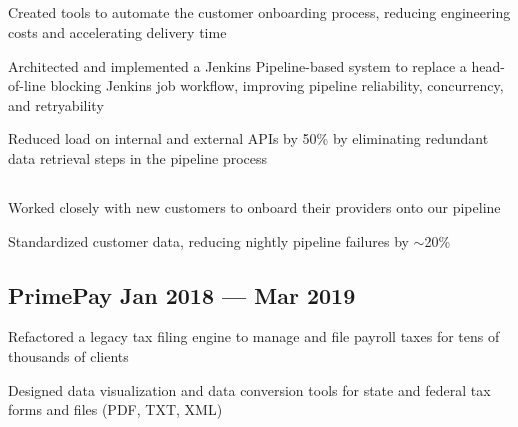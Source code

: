 \subsection{{\hfill}}
\begin{zitemize}
\item Created tools to automate the customer onboarding process, reducing engineering costs and accelerating delivery time
\item Architected and implemented a Jenkins Pipeline-based system to replace a head-of-line blocking Jenkins job workflow, improving pipeline reliability, concurrency, and retryability
\item Reduced load on internal and external APIs by 50\% by eliminating redundant data retrieval steps in the pipeline process
\end{zitemize}

\subsection{{\hfill}}
\begin{zitemize}
\item Worked closely with new customers to onboard their providers onto our pipeline
\item Standardized customer data, reducing nightly pipeline failures by $\sim$20\%
\end{zitemize}

\subsection{{PrimePay \hfill Jan 2018 --- Mar 2019}}
\begin{zitemize}
\item Refactored a legacy tax filing engine to manage and file payroll taxes for tens of thousands of clients
\item Designed data visualization and data conversion tools for state and federal tax forms and files (PDF, TXT, XML)
\end{zitemize}


